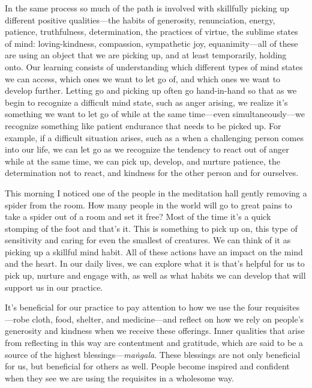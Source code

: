 In the same process so much of the path is involved with skillfully
picking up different positive qualities---the habits of generosity,
renunciation, energy, patience, truthfulness, determination, the
practices of virtue, the sublime states of mind: loving-kindness,
compassion, sympathetic joy, equanimity---all of these are using an
object that we are picking up, and at least temporarily, holding onto.
Our learning consists of \mbox{understanding} which different types of
mind states we can access, which ones we want to let go of, and which
ones we want to develop further. Letting go and picking up often go
hand-in-hand so that as we begin to recognize a difficult mind state,
such as anger arising, we realize it's something we want to let go of
while at the same time---even simultaneously---we recognize something
like patient endurance that needs to be picked up. For example, if a
difficult situation arises, such as a when a challenging person comes
into our life, we can let go as we recognize the tendency to react out
of anger while at the same time, we can pick up, develop, and nurture
patience, the determination not to react, and kindness for the other
person and for ourselves.

This morning I noticed one of the people in the meditation hall gently 
removing a spider from the room. How many people in the world will go 
to great pains to take a spider out of a room and set it free? Most of 
the time it's a quick stomping of the foot and that's it. This is 
something to pick up on, this type of sensitivity and caring for even 
the smallest of creatures. We can think of it as picking up a skillful 
mind habit. All of these actions have an impact on the mind and the 
heart. In our daily lives, we can explore what it is that's helpful for 
us to pick up, nurture and engage with, as well as what habits we can 
develop that will support us in our practice.


It's beneficial for our practice to pay attention to how we use the 
four requisites---robe cloth, food, shelter, and medicine---and reflect 
on how we rely on people's generosity and kindness when we receive 
these offerings. Inner qualities that arise from reflecting in this way 
are contentment and gratitude, which are said to be a source of the 
highest blessings---\emph{maṅgala}. These blessings are not only 
beneficial for us, but beneficial for others as well. People become 
inspired and confident when they see we are using the requisites in a 
wholesome way.

